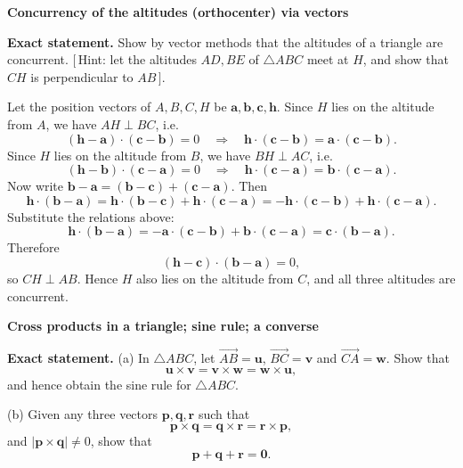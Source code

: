 \begin{problem}[CP-I-0061]
\label{prob:cp-i-0061}
\textbf{Concurrency of the altitudes (orthocenter) via vectors}

\textbf{Exact statement.}
\hspace*{1.5em}Show by vector methods that the altitudes of a triangle are concurrent.
\([\,\)Hint: let the altitudes \(AD,BE\) of \(\triangle ABC\) meet at \(H\), and show that \(CH\) is perpendicular to \(AB\,]\).

\end{problem}

\begin{solution}
Let the position vectors of \(A,B,C,H\) be \(\mathbf a,\mathbf b,\mathbf c,\mathbf h\).
Since \(H\) lies on the altitude from \(A\), we have \(AH\perp BC\), i.e.
\[
(\mathbf h-\mathbf a)\cdot(\mathbf c-\mathbf b)=0
\quad\Longrightarrow\quad
\mathbf h\cdot(\mathbf c-\mathbf b)=\mathbf a\cdot(\mathbf c-\mathbf b).
\]
Since \(H\) lies on the altitude from \(B\), we have \(BH\perp AC\), i.e.
\[
(\mathbf h-\mathbf b)\cdot(\mathbf c-\mathbf a)=0
\quad\Longrightarrow\quad
\mathbf h\cdot(\mathbf c-\mathbf a)=\mathbf b\cdot(\mathbf c-\mathbf a).
\]
Now write \(\mathbf b-\mathbf a=(\mathbf b-\mathbf c)+(\mathbf c-\mathbf a)\). Then
\[
\mathbf h\cdot(\mathbf b-\mathbf a)
=\mathbf h\cdot(\mathbf b-\mathbf c)+\mathbf h\cdot(\mathbf c-\mathbf a)
=-\mathbf h\cdot(\mathbf c-\mathbf b)+\mathbf h\cdot(\mathbf c-\mathbf a).
\]
Substitute the relations above:
\[
\mathbf h\cdot(\mathbf b-\mathbf a)
=-\mathbf a\cdot(\mathbf c-\mathbf b)+\mathbf b\cdot(\mathbf c-\mathbf a)
=\mathbf c\cdot(\mathbf b-\mathbf a).
\]
Therefore
\[
(\mathbf h-\mathbf c)\cdot(\mathbf b-\mathbf a)=0,
\]
so \(CH\perp AB\). Hence \(H\) also lies on the altitude from \(C\), and all three altitudes are concurrent.
\end{solution}

\begin{problem}[CP-I-0062]
\label{prob:cp-i-0062}
\textbf{Cross products in a triangle; sine rule; a converse}

\textbf{Exact statement.}
\hspace*{1.5em}(a) In \(\triangle ABC\), let \(\overrightarrow{AB}=\mathbf u\), \(\overrightarrow{BC}=\mathbf v\) and \(\overrightarrow{CA}=\mathbf w\).
Show that
\[
\mathbf u\times \mathbf v=\mathbf v\times \mathbf w=\mathbf w\times \mathbf u,
\]
and hence obtain the sine rule for \(\triangle ABC\).

(b) Given any three vectors \(\mathbf p,\mathbf q,\mathbf r\) such that
\[
\mathbf p\times \mathbf q=\mathbf q\times \mathbf r=\mathbf r\times \mathbf p,
\]
and \(|\mathbf p\times \mathbf q|\ne 0\), show that
\[
\mathbf p+\mathbf q+\mathbf r=\mathbf 0.
\]

\end{problem}

